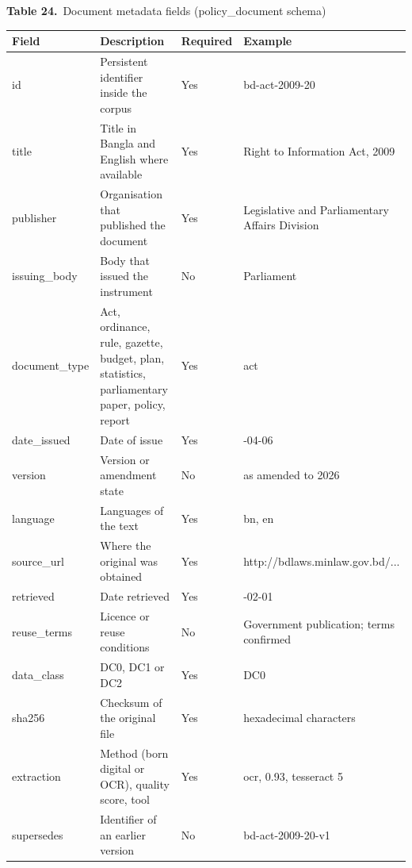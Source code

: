 \documentclass[border=10pt]{standalone}
\begin{document}
\begin{minipage}{17cm}
{\large\bfseries Table 24.}\ {\large Document metadata fields (policy\_document schema)}\par\vspace{7pt}
\small
{}
\begin{tabularx}{\linewidth}{@{}>{\hsize=0.762\hsize\raggedright\arraybackslash}X>{\hsize=1.667\hsize\raggedright\arraybackslash}X>{\hsize=0.429\hsize\raggedright\arraybackslash}X>{\hsize=1.143\hsize\raggedright\arraybackslash}X@{}}
\arrayrulecolor{bapilrule}\toprule
\rowcolor{white}\textbf{Field} & \textbf{Description} & \textbf{Required} & \textbf{Example} \\
\midrule
id & Persistent identifier inside the corpus & Yes & bd-act-2009-20 \\
title & Title in Bangla and English where available & Yes & Right to Information Act, 2009 \\
publisher & Organisation that published the document & Yes & Legislative and Parliamentary Affairs Division \\
issuing\_body & Body that issued the instrument & No & Parliament \\
document\_type & Act, ordinance, rule, gazette, budget, plan, statistics, parliamentary paper, policy, report & Yes & act \\
date\_issued & Date of issue & Yes & 2009-04-06 \\
version & Version or amendment state & No & as amended to 2026 \\
language & Languages of the text & Yes & bn, en \\
source\_url & Where the original was obtained & Yes & http:/\allowbreak{}/\allowbreak{}bdlaws.minlaw.gov.bd/\allowbreak{}... \\
retrieved & Date retrieved & Yes & 2027-02-01 \\
reuse\_terms & Licence or reuse conditions & No & Government publication; terms confirmed \\
data\_class & DC0, DC1 or DC2 & Yes & DC0 \\
sha256 & Checksum of the original file & Yes & 64 hexadecimal characters \\
extraction & Method (born digital or OCR), quality score, tool & Yes & ocr, 0.93, tesseract 5 \\
supersedes & Identifier of an earlier version & No & bd-act-2009-20-v1 \\
\bottomrule
\end{tabularx}
\par{}
\par{}
\end{minipage}
\end{document}
